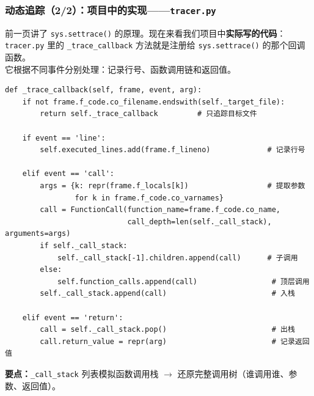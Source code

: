 \documentclass[presentation,aspectratio=169,fontset=none]{ctexbeamer}
\begin{document}
\begin{frame}[fragile]
\frametitle{动态追踪（2/2）：项目中的实现——\texttt{tracer.py}}
{\footnotesize 前一页讲了 \texttt{sys.settrace()} 的原理。现在来看我们项目中\textbf{实际写的代码}：\\
\texttt{tracer.py} 里的 \texttt{\_trace\_callback} 方法就是注册给 \texttt{sys.settrace()} 的那个回调函数。\\
它根据不同事件分别处理：记录行号、函数调用链和返回值。}

\vspace{0.05cm}
{\tiny
\begin{verbatim}
def _trace_callback(self, frame, event, arg):
    if not frame.f_code.co_filename.endswith(self._target_file):
        return self._trace_callback         # 只追踪目标文件

    if event == 'line':
        self.executed_lines.add(frame.f_lineno)             # 记录行号

    elif event == 'call':
        args = {k: repr(frame.f_locals[k])                  # 提取参数
                for k in frame.f_code.co_varnames}
        call = FunctionCall(function_name=frame.f_code.co_name,
                            call_depth=len(self._call_stack), arguments=args)
        if self._call_stack:
            self._call_stack[-1].children.append(call)      # 子调用
        else:
            self.function_calls.append(call)                 # 顶层调用
        self._call_stack.append(call)                        # 入栈

    elif event == 'return':
        call = self._call_stack.pop()                        # 出栈
        call.return_value = repr(arg)                        # 记录返回值
\end{verbatim}}

\vspace{0.05cm}
{\footnotesize\textbf{要点：}\texttt{\_call\_stack} 列表模拟函数调用栈 $\rightarrow$ 还原完整调用树（谁调用谁、参数、返回值）。}
\end{frame}

\end{document}
